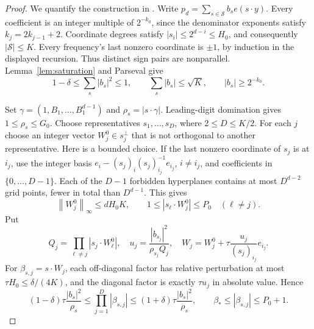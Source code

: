\documentclass[11pt]{article}
\theoremstyle{remark}
\newcommand{\norm}[1]{\left\|#1\right\|}
\begin{document}
\begin{proof}
We quantify the construction in \cite[Section 4]{main}.
Write $p_d=\sum_{s\in\mathcal S}b_se(s\cdot y)$.
Every coefficient is an integer multiple of $2^{-k_0}$, since the
denominator exponents satisfy $k_j=2k_{j-1}+2$. Coordinate degrees satisfy
$|s_i|\le2^{d-i}\le H_0$, and consequently $|\mathcal S|\le K$.
Every frequency's last nonzero coordinate is $\pm1$, by induction in
the displayed recursion. Thus distinct sign pairs are nonparallel.
Lemma~\ref{lem:saturation} and Parseval give
\[
 1-\delta\le\sum_s|b_s|^2\le1,\qquad
 \sum_s|b_s|\le\sqrt K,\qquad |b_s|\ge2^{-k_0}.
\]

Set $\gamma=(1,B_1,\ldots,B_1^{d-1})$ and
$\rho_s=|s\cdot\gamma|$. Leading-digit domination gives
$1\le\rho_s\le G_0$. Choose representatives $s_1,\ldots,s_D$, where
$2\le D\le K/2$. For each $j$ choose an integer vector
$W_j^0\in s_j^\perp$ that is not orthogonal to another representative.
Here is a bounded choice. If the last nonzero coordinate of $s_j$ is
at $i_j$, use the integer basis
$e_i-(s_j)_i(s_j)_{i_j}^{-1}e_{i_j}$, $i\ne i_j$, and coefficients
in $\{0,\ldots,D-1\}$. Each of the $D-1$ forbidden hyperplanes contains
at most $D^{d-2}$ grid points, fewer in total than $D^{d-1}$.
This gives
\[
 \norm{W_j^0}_\infty\le dH_0K,
 \qquad 1\le|s_\ell\cdot W_j^0|\le P_0\quad(\ell\ne j).
\]
Put
\[
 Q_j=\prod_{\ell\ne j}|s_j\cdot W_\ell^0|,
 \quad u_j=\frac{|b_{s_j}|^2}{\rho_{s_j}Q_j},
 \quad W_j=W_j^0+\tau\frac{u_j}{(s_j)_{i_j}}e_{i_j}.
\]
For $\beta_{s,j}=s\cdot W_j$, each off-diagonal factor has relative
perturbation at most $\tau H_0\le\delta/(4K)$, and the diagonal factor
is exactly $\tau u_j$ in absolute value. Hence
\begin{equation}\label{eq:beta-product}
 (1-\delta)\tau\frac{|b_s|^2}{\rho_s}
 \le\prod_{j=1}^D|\beta_{s,j}|
 \le(1+\delta)\tau\frac{|b_s|^2}{\rho_s},
 \qquad \beta_*\le|\beta_{s,j}|\le P_0+1.
\end{equation}


\end{proof}
\end{document}
